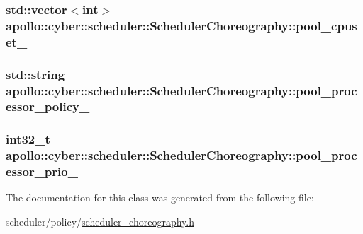\hypertarget{classapollo_1_1cyber_1_1scheduler_1_1SchedulerChoreography_a5a5d905d92f6bcd94aa7b703cc7075db}{
\subsubsection[{pool\-\_\-cpuset\-\_\-}]{\setlength{\rightskip}{0pt plus 5cm}std\-::vector$<$int$>$ apollo\-::cyber\-::scheduler\-::\-Scheduler\-Choreography\-::pool\-\_\-cpuset\-\_\-\hspace{0.3cm}{\ttfamily [private]}}}\label{classapollo_1_1cyber_1_1scheduler_1_1SchedulerChoreography_a5a5d905d92f6bcd94aa7b703cc7075db}
\hypertarget{classapollo_1_1cyber_1_1scheduler_1_1SchedulerChoreography_a9b191db22dbd0ce253ac37faa2407585}{
\subsubsection[{pool\-\_\-processor\-\_\-policy\-\_\-}]{\setlength{\rightskip}{0pt plus 5cm}std\-::string apollo\-::cyber\-::scheduler\-::\-Scheduler\-Choreography\-::pool\-\_\-processor\-\_\-policy\-\_\-\hspace{0.3cm}{\ttfamily [private]}}}\label{classapollo_1_1cyber_1_1scheduler_1_1SchedulerChoreography_a9b191db22dbd0ce253ac37faa2407585}
\hypertarget{classapollo_1_1cyber_1_1scheduler_1_1SchedulerChoreography_a7914b4df5ee5649eafed83731ef5d4cd}{
\subsubsection[{pool\-\_\-processor\-\_\-prio\-\_\-}]{\setlength{\rightskip}{0pt plus 5cm}int32\-\_\-t apollo\-::cyber\-::scheduler\-::\-Scheduler\-Choreography\-::pool\-\_\-processor\-\_\-prio\-\_\-\hspace{0.3cm}{\ttfamily [private]}}}\label{classapollo_1_1cyber_1_1scheduler_1_1SchedulerChoreography_a7914b4df5ee5649eafed83731ef5d4cd}


The documentation for this class was generated from the following file\-:\begin{DoxyCompactItemize}
\item 
scheduler/policy/\hyperlink{scheduler__choreography_8h}{scheduler\-\_\-choreography.\-h}\end{DoxyCompactItemize}
